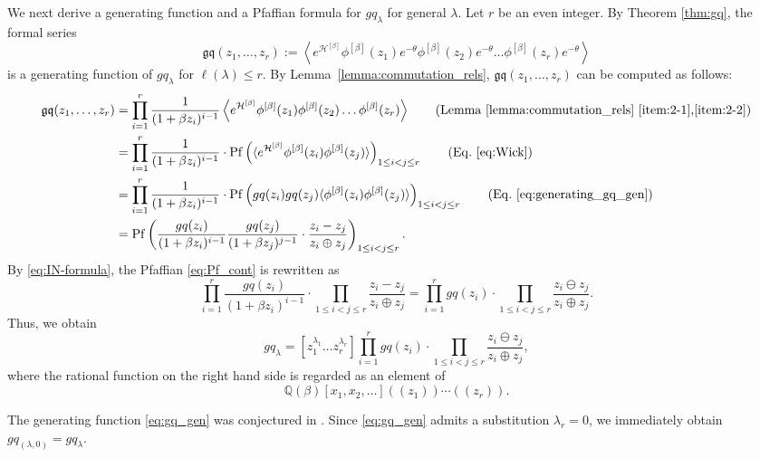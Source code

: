 \documentclass{amsart}
\def\QQ{\mathord{\mathbb{Q}}}
\begin{document}
We next derive a generating function and a Pfaffian formula for $gq_\lambda$ for general $\lambda$.
Let $r$ be an even integer.
By Theorem \ref{thm:gq}, the formal series
\[
\mathfrak{gq}(z_1,\dots,z_r)
:=\left\langle
e^{\mathcal{H}^{[\beta]}}
\phi^{[\beta]}(z_1)e^{-\theta}
\phi^{[\beta]}(z_2)e^{-\theta}
\dots
\phi^{[\beta]}(z_r)e^{-\theta} 
\right\rangle
\]
is a generating function of $gq_\lambda$ for $\ell(\lambda)\leq r$.
By Lemma~\ref{lemma:commutation_rels}, $\mathfrak{gq}(z_1,\dots,z_r)$ can be computed as follows:
\begin{align}
\mathfrak{gq}(z_1,\dots,z_r)\nonumber
&=
\prod_{i=1}^r\frac{1}{(1+\beta z_i)^{i-1}}
\left\langle
e^{\mathcal{H}^{[\beta]}}
\phi^{[\beta]}(z_1)
\phi^{[\beta]}(z_2)
\dots
\phi^{[\beta]}(z_r)
\right\rangle\nonumber
\qquad (\text{Lemma~\ref{lemma:commutation_rels}~\eqref{item:2-1},\eqref{item:2-2}})
\allowdisplaybreaks
\\
&=
\prod_{i=1}^r\frac{1}{(1+\beta z_i)^{i-1}}
\cdot \mathrm{Pf}\left(
\langle
e^{\mathcal{H}^{[\beta]}}
\phi^{[\beta]}(z_i)
\phi^{[\beta]}(z_j)
\rangle
\right)_{1\leq i<j\leq r}\nonumber
\qquad (\mathrm{Eq.~\eqref{eq:Wick}})
\allowdisplaybreaks
\\
&=
\prod_{i=1}^r\frac{1}{(1+\beta z_i)^{i-1}}
\cdot
\mathrm{Pf}\left(
gq(z_i)gq(z_j)
\langle
\phi^{[\beta]}(z_i)
\phi^{[\beta]}(z_j)
\rangle
\right)_{1\leq i<j\leq r}\nonumber
\qquad (\mathrm{Eq.~\eqref{eq:generating_gq_gen}})
\allowdisplaybreaks
\\
&=
\mathrm{Pf}\left(
\frac{gq(z_i)}{(1+\beta z_i)^{i-1}}
\frac{gq(z_j)}{(1+\beta z_j)^{j-1}}
\cdot 
\frac{z_i-z_j}{z_i\oplus z_j}
\right)_{1\leq i<j\leq r}.\label{eq:Pf_cont}
\end{align}
By \eqref{eq:IN-formula}, the Pfaffian \eqref{eq:Pf_cont} is rewritten as
\[
\prod_{i=1}^r\frac{gq(z_i)}{(1+\beta z_i)^{i-1}}
\cdot
\prod_{1\leq i<j\leq r}
\frac{z_i-z_j}{z_i\oplus z_j}=
\prod_{i=1}^r gq(z_i)
\cdot
\prod_{1\leq i<j\leq r}
\frac{z_i\ominus z_j}{z_i\oplus z_j}.
\]
Thus, we obtain
\begin{equation}\label{eq:gq_gen}
gq_\lambda=[z_1^{\lambda_1}\dots z_r^{\lambda_r}]
\prod_{i=1}^r gq(z_i)
\cdot
\prod_{1\leq i<j\leq r}
\frac{z_i\ominus z_j}{z_i\oplus z_j},
\end{equation}
where the rational function on the right hand side is regarded as an element of \[
\QQ(\beta)[x_1,x_2,\dots]((z_1))\cdots ((z_r)).
\]

The generating function \eqref{eq:gq_gen} was conjectured in \cite[Conjecture 5.3]{nakagawa2023universal}.
Since \eqref{eq:gq_gen} admits a substitution $\lambda_r=0$, we immediately obtain $gq_{(\lambda,0)}=gq_{\lambda}$.
\end{document}
